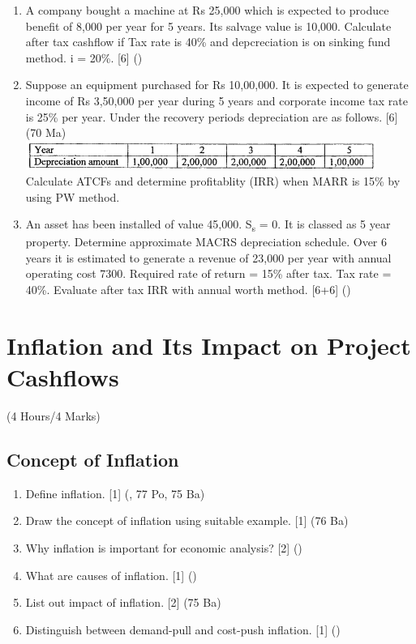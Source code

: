 \documentclass[12pt]{article}
\newcommand{\sub}[1]{\textsubscript{#1}}
\begin{document}
\begin{enumerate}
			\item A company bought a machine at Rs 25,000 which is expected to produce benefit of 8,000 per year for 5 years. Its salvage value is 10,000. Calculate after tax cashflow if Tax rate is 40\% and depcreciation is on sinking fund method. i = 20\%. \hfill [6] ()

			\item Suppose an equipment purchased for Rs 10,00,000. It is expected to generate income of Rs 3,50,000 per year during 5 years and corporate income tax rate is 25\% per year. Under the recovery periods depreciation are as follows. \hfill [6] (70 Ma)\\
			\includegraphics[width=4.5in]{./pics/ee_6}\\
			Calculate ATCFs and determine profitablity (IRR) when MARR is 15\% by using PW method.

			\item An asset has been installed of value 45,000. S\sub{s} = 0. It is classed as 5 year property. Determine approximate MACRS depreciation schedule. Over 6 years it is estimated to generate a revenue of 23,000 per year with annual operating cost 7300. Required rate of return = 15\% after tax. Tax rate = 40\%. Evaluate after tax IRR with annual worth method. \hfill [6+6] ()
		\end{enumerate}

	\pagebreak

\section{Inflation and Its Impact on Project Cashflows}
	\begin{center}(4 Hours/4 Marks)\end{center}
	\subsection{Concept of Inflation}
		\begin{enumerate}[noitemsep, topsep=0pt]
			\item Define inflation. \hfill [1] (, 77 Po, 75 Ba)

			\item Draw the concept of inflation using suitable example. \hfill [1] (76 Ba)

			\item Why inflation is important for economic analysis? \hfill [2] ()

			\item What are causes of inflation. \hfill [1] ()

			\item List out impact of inflation. \hfill [2] (75 Ba)

			\item Distinguish between demand-pull and cost-push inflation. \hfill [1] ()
		\end{enumerate}
\end{document}
